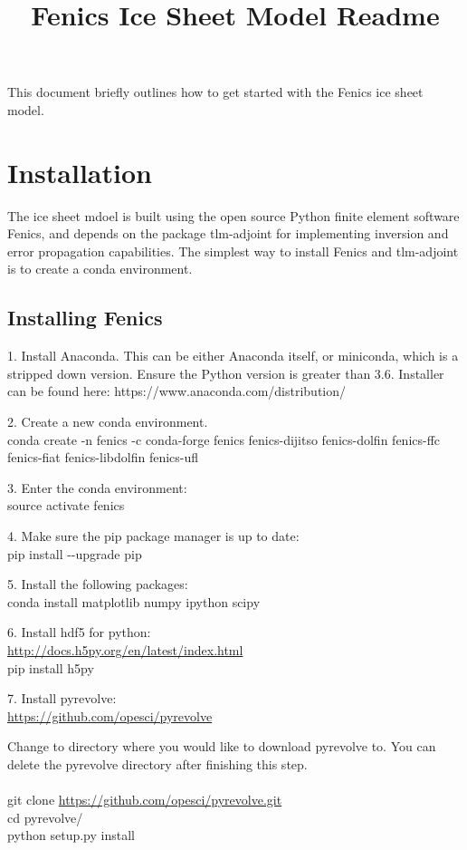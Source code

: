 \documentclass[11pt, reqno, nocenter]{article}
\title{Fenics Ice Sheet Model Readme}
\begin{document}
\maketitle

This document briefly outlines how to get started with the Fenics ice sheet model. 


\section{Installation}

The ice sheet mdoel is built using the open source Python finite element software Fenics, and depends on the package tlm-adjoint for implementing inversion and error propagation capabilities. The simplest way to install Fenics and tlm-adjoint is to create a conda environment. 

\subsection{Installing Fenics}
 
1. Install Anaconda. This can be either Anaconda itself, or miniconda, which is a stripped down version. Ensure the Python version is greater than 3.6. Installer can be found here: https://www.anaconda.com/distribution/ 

2. Create a new conda environment. \\
conda create -n fenics -c conda-forge fenics fenics-dijitso fenics-dolfin fenics-ffc fenics-fiat fenics-libdolfin fenics-ufl

3. Enter the conda environment: \\
source activate fenics

4. Make sure the pip package manager is up to date: \\
pip install -{}-upgrade pip

5. Install the following packages: \\
conda install matplotlib numpy ipython scipy 

6. Install hdf5 for python: \\
\url{http://docs.h5py.org/en/latest/index.html} \\
pip install h5py

7. Install pyrevolve: \\
\url{https://github.com/opesci/pyrevolve}

Change to directory where you would like to download pyrevolve to. You can delete the pyrevolve directory after finishing this step. \\ \\
git clone \url{https://github.com/opesci/pyrevolve.git} \\
cd pyrevolve/ \\
python setup.py install
\end{document}
